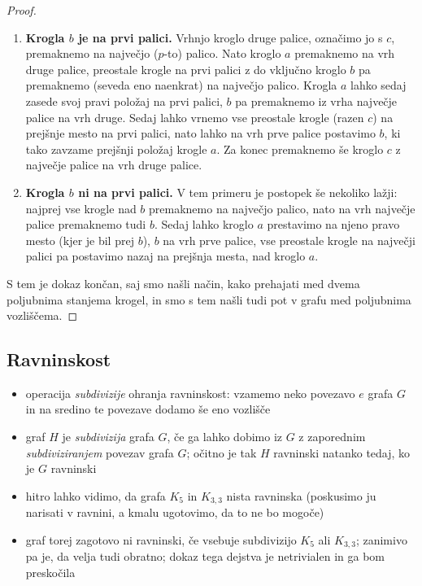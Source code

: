 \documentclass[11pt,a4paper]{article}
\theoremstyle{definition} %
\theoremstyle{plain} %
\begin{document}
\begin{proof}
    \begin{enumerate}
        \item \textbf{Krogla $b$ je na prvi palici.}
        Vrhnjo kroglo druge palice, označimo jo s $c$, premaknemo na največjo ($p$-to) palico. Nato kroglo $a$ premaknemo na vrh druge palice, preostale krogle na prvi palici z do vključno kroglo $b$ pa premaknemo (seveda eno naenkrat) na največjo palico. Krogla $a$ lahko sedaj zasede svoj pravi položaj na prvi palici, $b$ pa premaknemo iz vrha največje palice na vrh druge. Sedaj lahko vrnemo vse preostale krogle (razen $c$) na prejšnje mesto na prvi palici, nato lahko na vrh prve palice postavimo $b$, ki tako zavzame prejšnji položaj krogle $a$. Za konec premaknemo še kroglo $c$ z največje palice na vrh druge palice.
        \item \textbf{Krogla $b$ ni na prvi palici.}
        V tem primeru je postopek še nekoliko lažji: najprej vse krogle nad $b$ premaknemo na največjo palico, nato na vrh največje palice premaknemo tudi $b$. Sedaj lahko kroglo $a$ prestavimo na njeno pravo mesto (kjer je bil prej $b$), $b$ na vrh prve palice, vse preostale krogle na največji palici pa postavimo nazaj na prejšnja mesta, nad kroglo $a$.
    \end{enumerate}
    S tem je dokaz končan, saj smo našli način, kako prehajati med dvema poljubnima stanjema krogel, in smo s tem našli tudi pot v grafu med poljubnima vozliščema.
\end{proof}

\subsection{Ravninskost}
\begin{itemize}
    \item operacija \emph{subdivizije} ohranja ravninskost: vzamemo neko povezavo $e$ grafa $G$ in na sredino te povezave dodamo še eno vozlišče 
    \item graf $H$ je \emph{subdivizija} grafa $G$, če ga lahko dobimo iz $G$ z zaporednim \emph{subdiviziranjem} povezav grafa $G$; očitno je tak $H$ ravninski natanko tedaj, ko je $G$ ravninski
    \item hitro lahko vidimo, da grafa $K_5$ in $K_{3,3}$ nista ravninska (poskusimo ju narisati v ravnini, a kmalu ugotovimo, da to ne bo mogoče)
    \item graf torej zagotovo ni ravninski, če vsebuje subdivizijo $K_5$ ali $K_{3,3}$; zanimivo pa je, da velja tudi obratno; dokaz tega dejstva je netrivialen in ga bom preskočila
\end{itemize}
\end{document}
